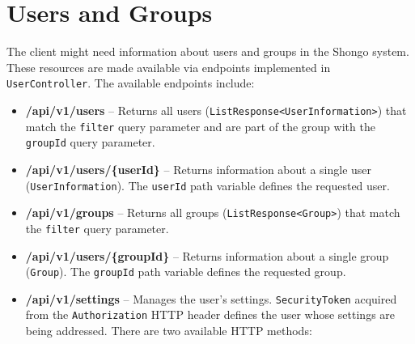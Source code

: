 \section{Users and Groups}
The client might need information about users and groups in the Shongo system.
These resources are made available via endpoints implemented in \texttt{UserController}.
The available endpoints include:
\begin{itemize}
    \item \textbf{\text{[GET]} /api/v1/users} -- Returns all users (\texttt{ListResponse<UserIn\-formation>}) that match the \texttt{filter} query parameter and are part of the group with the \texttt{groupId} query parameter.
    \item \textbf{\text{[GET]} /api/v1/users/\{userId\}} -- Returns information about a single user (\texttt{UserInformation}). The \texttt{userId} path variable defines the requested user.
    \item \textbf{\text{[GET]} /api/v1/groups} -- Returns all groups (\texttt{ListResponse<Group>}) that match the \texttt{filter} query parameter.
    \item \textbf{\text{[GET]} /api/v1/users/\{groupId\}} -- Returns information about a single group (\texttt{Group}). The \texttt{groupId} path variable defines the requested group.
    \item \textbf{/api/v1/settings} -- Manages the user’s settings. \texttt{SecurityToken} acquired from the \texttt{Authorization} HTTP header defines the user whose settings are being addressed. There are two available HTTP methods:
\end{itemize}
